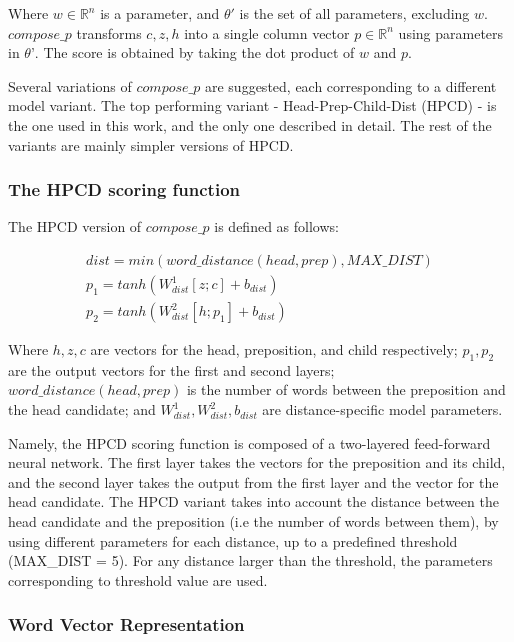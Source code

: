 Where $w \in \mathbb{R}^n$ is a parameter, and $\theta'$ is the set of all parameters, excluding $w$. $compose\_p$ transforms $c, z, h$ into a single column vector $p \in \mathbb{R}^n$ using parameters in $\theta’$.  The score is obtained by taking the dot product of $w$ and $p$. 

Several variations of $compose\_p$ are suggested, each corresponding to a different model variant. The top performing variant - Head-Prep-Child-Dist (HPCD) - is the one used in this work, and the only one described in detail. The rest of the variants are mainly simpler versions of HPCD.

\subsubsection{The HPCD scoring function}
The HPCD version of $compose\_p$ is defined as follows:

\begin{equation}
\begin{gathered}  
   dist = min(word\_distance(head, prep), MAX\_DIST)  \\
   p_1 = tanh(W^1_{dist}[z;c] + b_{dist})   \\
   p_2 = tanh(W^2_{dist}[h;p_1] + b_{dist})     
\end{gathered}\label{eq:hpcd}
\end{equation}



Where $h, z, c$ are vectors for the head, preposition, and child respectively; $p_1, p_2$ are the output vectors for the first and second layers;
$word\_distance(head, prep)$ is the number of words between the preposition and the head candidate; and $ W^1_{dist}, W^2_{dist}, b_{dist}$ are distance-specific model parameters.

Namely, the HPCD scoring function is composed of a two-layered feed-forward neural network. The first layer takes the vectors for the preposition and its child, and the second layer takes the output from the first layer and the vector for the head candidate. The HPCD variant takes into account the distance between the head candidate and the preposition (i.e the number of words between them), by using different parameters for each distance, up to a predefined threshold (MAX\_DIST = 5). For any distance larger than the threshold, the parameters corresponding to threshold value are used.

\subsubsection{Word Vector Representation} \label{section:hpcd_wordvectors}

